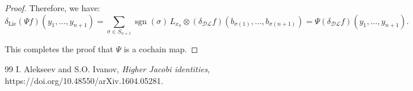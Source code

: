 \documentclass[10pt,a4paper]{amsart}
\newcommand{\DL}{\mathcal{DL}}
\begin{document}
\begin{proof}
Therefore, we have:
\[
\delta_{\mathrm{Lie}} (\Psi f)(y_1, \dots, y_{n+1}) = \sum_{\sigma \in S_{n+1}} \operatorname{sgn}(\sigma) \, L_{x_\sigma} \otimes (\delta_{\DL} f)(b_{\sigma(1)}, \dots, b_{\sigma(n+1)}) = \Psi(\delta_{\DL} f)(y_1, \dots, y_{n+1}).
\]

This completes the proof that \(\Psi\) is a cochain map.

 
\end{proof}

\begin{thebibliography}{99}
 I. Alekseev and S.O. Ivanov, \emph{Higher Jacobi identities}, https://doi.org/10.48550/arXiv.1604.05281.
\end{thebibliography}
\end{document}
